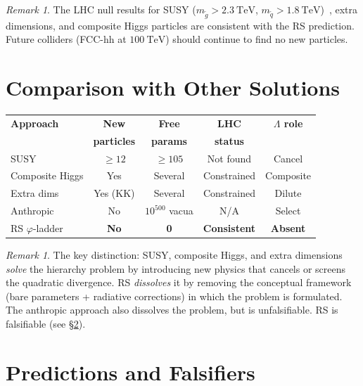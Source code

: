 \documentclass[12pt,a4paper]{article}
\theoremstyle{definition}
\theoremstyle{remark}
\newtheorem{remark}[theorem]{Remark}
\begin{document}
\begin{remark}
The LHC null results for SUSY ($m_{\tilde{g}} >
2.3~\mathrm{TeV}$, $m_{\tilde{q}} >
1.8~\mathrm{TeV}$)~\cite{ATLAS_SUSY2023}, extra
dimensions, and composite Higgs particles are consistent
with the RS prediction.  Future colliders (FCC-hh at
$100~\mathrm{TeV}$) should continue to find no new
particles.
\end{remark}

\section{Comparison with Other Solutions}
\label{sec:comparison}

\begin{center}
\renewcommand{\arraystretch}{1.3}
\begin{tabular}{@{}lcccc@{}}
\toprule
\textbf{Approach} & \textbf{New} &
\textbf{Free} & \textbf{LHC} &
\textbf{$\Lambda$ role} \\
& \textbf{particles} & \textbf{params} &
\textbf{status} & \\
\midrule
SUSY & $\geq 12$ & $\geq 105$ & Not found &
Cancel \\
Composite Higgs & Yes & Several &
Constrained & Composite \\
Extra dims & Yes (KK) & Several &
Constrained & Dilute \\
Anthropic & No & $10^{500}$ vacua &
N/A & Select \\
RS $\varphi$-ladder & \textbf{No} & \textbf{0} &
\textbf{Consistent} & \textbf{Absent} \\
\bottomrule
\end{tabular}
\end{center}

\begin{remark}
The key distinction: SUSY, composite Higgs, and extra
dimensions \emph{solve} the hierarchy problem by
introducing new physics that cancels or screens the
quadratic divergence.  RS \emph{dissolves} it by removing
the conceptual framework (bare parameters + radiative
corrections) in which the problem is formulated.  The
anthropic approach also dissolves the problem, but is
unfalsifiable.  RS is falsifiable (see
\S\ref{sec:predictions}).
\end{remark}

\section{Predictions and Falsifiers}
\label{sec:predictions}
\end{document}
